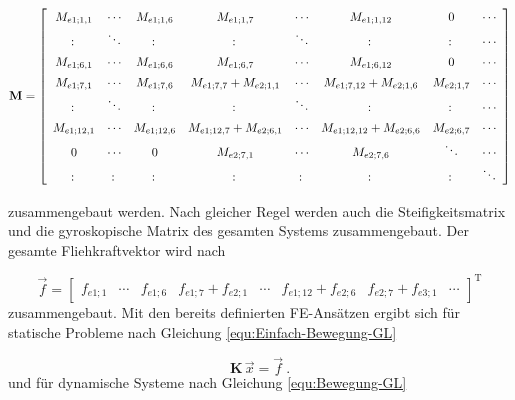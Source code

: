 	\begin{equation}\label{equ:Gesamtmassenmatrix}
	\renewcommand{\arraystretch}{1.4}
	\mathbf{M}=
	\left[ 
	\begin{array}{cccccccc}
	M_{e1;1,1}  & \cdots & M_{e1;1,6}  & M_{e1;1,7}             & \cdots     & M_{e1;1,12}             & 0          &\cdots\\
	\colon      & \ddots & \colon      & \colon                 & \ddots     & \colon                  & \colon     &\cdots\\
	M_{e1;6,1}  & \cdots & M_{e1;6,6}  & M_{e1;6,7}             & \cdots     & M_{e1;6,12}             & 0          &\cdots\\
	M_{e1;7,1}  & \cdots & M_{e1;7,6}  & M_{e1;7,7}+M_{e2;1,1}  & \cdots     & M_{e1;7,12}+M_{e2;1,6}  & M_{e2;1,7} &\cdots\\
	\colon      & \ddots & \colon      & \colon                 & \ddots     & \colon                  & \colon     &\cdots\\
	M_{e1;12,1} & \cdots & M_{e1;12,6} & M_{e1;12,7}+M_{e2;6,1} & \cdots     & M_{e1;12,12}+M_{e2;6,6} & M_{e2;6,7} &\cdots\\
	0           & \cdots & 0           & M_{e2;7,1}             & \cdots     & M_{e2;7,6}              & \ddots     &\cdots\\
	\colon      & \colon & \colon      & \colon                 & \colon     & \colon                  & \colon     &\ddots\\
	\end{array}
	\right] 
	\end{equation}
	
	zusammengebaut werden. Nach gleicher Regel werden auch die Steifigkeitsmatrix und die gyroskopische Matrix des gesamten Systems zusammengebaut. Der gesamte Fliehkraftvektor wird nach 
	
	\begin{equation}\label{equ:Gesamtfliehkraft}
	\vec{f} = \left[ 
	\begin{array}{llllllll}
	f_{e1;1} & \cdots & f_{e1;6} & f_{e1;7}+f_{e2;1} & \cdots & f_{e1;12}+f_{e2;6} & f_{e2;7}+f_{e3;1} & \cdots  
	\end{array} 
	\right]^{\mathrm{T}}
	\end{equation} 
	zusammengebaut. Mit den bereits definierten FE-Ansätzen ergibt sich für statische Probleme  nach Gleichung \ref{equ:Einfach-Bewegung-GL} 
	
	\begin{equation}\label{equ:Einfach-Bewegung-GL-mit-P-F}
	\mathbf{K}\, \vec{x} = \vec{f} \ .
	\end{equation}
	und für dynamische Systeme nach Gleichung \ref{equ:Bewegung-GL}
	
